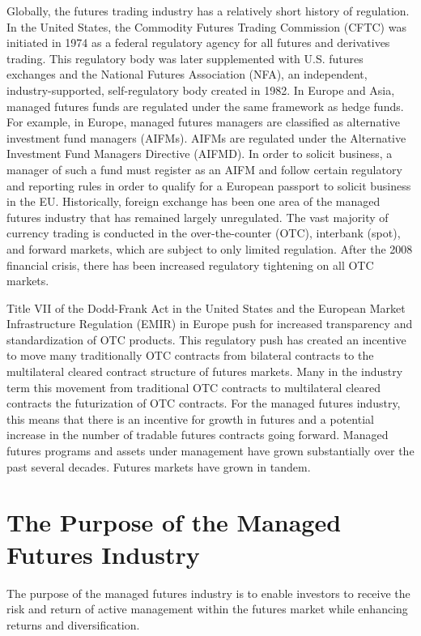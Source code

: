 \documentclass[11pt]{article}
\begin{document}
Globally, the futures trading industry has a relatively short history of regulation. In the United States, the Commodity Futures Trading Commission (CFTC) was initiated in 1974 as a federal regulatory agency for all futures and derivatives trading. This regulatory body was later supplemented with U.S. futures exchanges and the National Futures Association (NFA), an independent, industry-supported, self-regulatory body created in 1982. In Europe and Asia, managed futures funds are regulated under the same framework as hedge funds. For example, in Europe, managed futures managers are classified as alternative investment fund managers (AIFMs). AIFMs are regulated under the Alternative Investment Fund Managers Directive (AIFMD). In order to solicit business, a manager of such a fund must register as an AIFM and follow certain regulatory and reporting rules in order to qualify for a European passport to solicit business in the EU. Historically, foreign exchange has been one area of the managed futures industry that has remained largely unregulated. The vast majority of currency trading is conducted in the over-the-counter (OTC), interbank (spot), and forward markets, which are subject to only limited regulation. After the 2008 financial crisis, there has been increased regulatory tightening on all OTC markets.

Title VII of the Dodd-Frank Act in the United States and the European Market Infrastructure Regulation (EMIR) in Europe push for increased transparency and standardization of OTC products. This regulatory push has created an incentive to move many traditionally OTC contracts from bilateral contracts to the multilateral cleared contract structure of futures markets. Many in the industry term this movement from traditional OTC contracts to multilateral cleared contracts the futurization of OTC contracts. For the managed futures industry, this means that there is an incentive for growth in futures and a potential increase in the number of tradable futures contracts going forward. Managed futures programs and assets under management have grown substantially over the past several decades. Futures markets have grown in tandem.

\section*{The Purpose of the Managed Futures Industry}
The purpose of the managed futures industry is to enable investors to receive the risk and return of active management within the futures market while enhancing returns and diversification.
\end{document}
